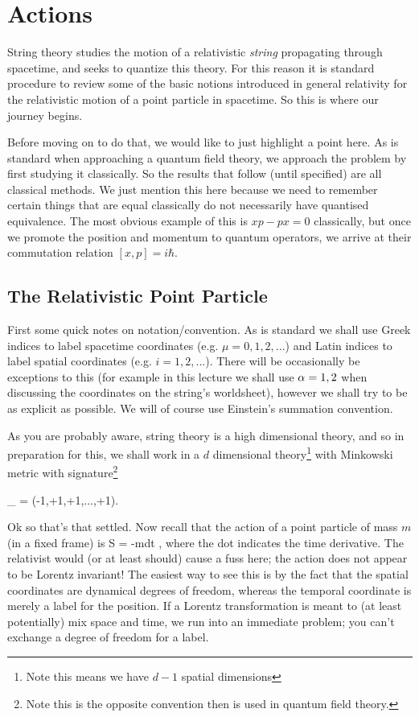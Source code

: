 \chapter{Actions}

String theory studies the motion of a relativistic \textit{string} propagating through spacetime, and seeks to quantize this theory. For this reason it is standard procedure to review some of the basic notions introduced in general relativity for the relativistic motion of a point particle in spacetime. So this is where our journey begins. 

Before moving on to do that, we would like to just highlight a point here. As is standard when approaching a quantum field theory, we approach the problem by first studying it classically. So the results that follow (until specified) are all classical methods. We just mention this here because we need to remember certain things that are equal classically do not necessarily have quantised equivalence. The most obvious example of this is $xp-px =0$ classically, but once we promote the position and momentum to quantum operators, we arrive at their commutation relation $[x,p]=i\hbar$.

\section{The Relativistic Point Particle}

First some quick notes on notation/convention. As is standard we shall use Greek indices to label spacetime coordinates (e.g. $\mu = 0,1,2,...$) and Latin indices to label spatial coordinates (e.g. $i=1,2,...$). There will be occasionally be exceptions to this (for example in this lecture we shall use $\alpha=1,2$ when discussing the coordinates on the string's worldsheet), however we shall try to be as explicit as possible. We will of course use Einstein's summation convention. 

As you are probably aware, string theory is a high dimensional theory, and so in preparation for this, we shall work in a $d$ dimensional theory\footnote{Note this means we have $d-1$ spatial dimensions} with Minkowski metric with signature\footnote{Note this is the opposite convention then is used in quantum field theory.} 

\bse 
    \eta_{\mu\nu} = \diag(-1,+1,+1,...,+1).
\ese 

Ok so that's that settled. Now recall that the action of a point particle of mass $m$ (in a fixed frame) is 
\be
\label{eqn:PointActionSpatial}
    S = -m\int dt ,
\ee 
where the dot indicates the time derivative. The relativist would (or at least should) cause a fuss here; the action  does not appear to be Lorentz invariant! The easiest way to see this is by the fact that the spatial coordinates are dynamical degrees of freedom, whereas the temporal coordinate is merely a label for the position. If a Lorentz transformation is meant to (at least potentially) mix space and time, we run into an immediate problem; you can't exchange a degree of freedom for a label. 


